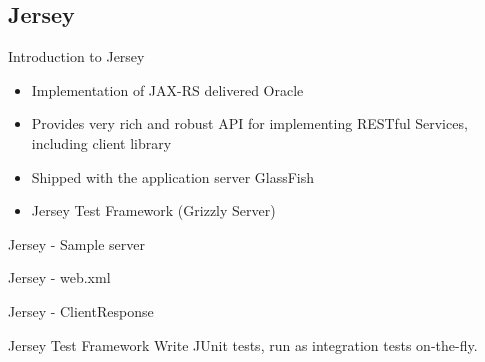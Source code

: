 \subsection{Jersey}
	\begin{frame}{Introduction to Jersey}
		\begin{itemize}
		  \item Implementation of JAX-RS delivered Oracle
		  \item Provides very rich and robust API for implementing RESTful Services, including client library
		  \item Shipped with the application server GlassFish
		  \item Jersey Test Framework (Grizzly Server)
		\end{itemize}
	\end{frame}
 
\begin{frame}{Jersey - Sample server}
	  
\end{frame} 

\begin{frame}{Jersey - web.xml}
	   
\end{frame}

\begin{frame}{Jersey - ClientResponse}
	
\end{frame}

\begin{frame}{Jersey Test Framework}
	Write JUnit tests, run as integration tests on-the-fly.
	
	  
\end{frame}
  